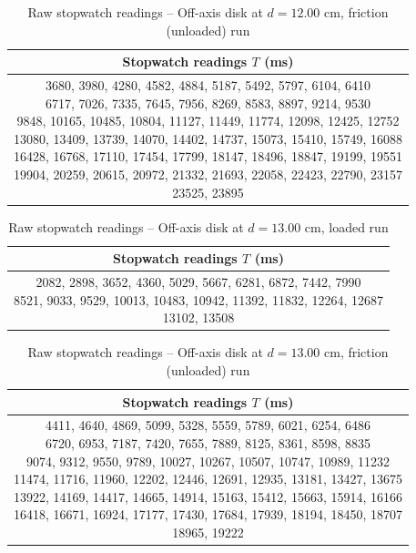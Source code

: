 \begin{table}[htb!]
\centering
\caption{Raw stopwatch readings -- Off-axis disk at $d = 12.00$ cm, friction (unloaded) run}
\begin{tabular}{c}
\toprule
Stopwatch readings $T$ (\unit{\ms}) \\
\midrule
\makecell{3680, 3980, 4280, 4582, 4884, 5187, 5492, 5797, 6104, 6410 \\ 6717, 7026, 7335, 7645, 7956, 8269, 8583, 8897, 9214, 9530 \\ 9848, 10165, 10485, 10804, 11127, 11449, 11774, 12098, 12425, 12752 \\ 13080, 13409, 13739, 14070, 14402, 14737, 15073, 15410, 15749, 16088 \\ 16428, 16768, 17110, 17454, 17799, 18147, 18496, 18847, 19199, 19551 \\ 19904, 20259, 20615, 20972, 21332, 21693, 22058, 22423, 22790, 23157 \\ 23525, 23895} \\
\bottomrule
\end{tabular}
\end{table}
\begin{table}[htb!]
\centering
\caption{Raw stopwatch readings -- Off-axis disk at $d = 13.00$ cm, loaded run}
\begin{tabular}{c}
\toprule
Stopwatch readings $T$ (\unit{\ms}) \\
\midrule
\makecell{2082, 2898, 3652, 4360, 5029, 5667, 6281, 6872, 7442, 7990 \\ 8521, 9033, 9529, 10013, 10483, 10942, 11392, 11832, 12264, 12687 \\ 13102, 13508} \\
\bottomrule
\end{tabular}
\end{table}
\begin{table}[htb!]
\centering
\caption{Raw stopwatch readings -- Off-axis disk at $d = 13.00$ cm, friction (unloaded) run}
\begin{tabular}{c}
\toprule
Stopwatch readings $T$ (\unit{\ms}) \\
\midrule
\makecell{4411, 4640, 4869, 5099, 5328, 5559, 5789, 6021, 6254, 6486 \\ 6720, 6953, 7187, 7420, 7655, 7889, 8125, 8361, 8598, 8835 \\ 9074, 9312, 9550, 9789, 10027, 10267, 10507, 10747, 10989, 11232 \\ 11474, 11716, 11960, 12202, 12446, 12691, 12935, 13181, 13427, 13675 \\ 13922, 14169, 14417, 14665, 14914, 15163, 15412, 15663, 15914, 16166 \\ 16418, 16671, 16924, 17177, 17430, 17684, 17939, 18194, 18450, 18707 \\ 18965, 19222} \\
\bottomrule
\end{tabular}
\end{table}
